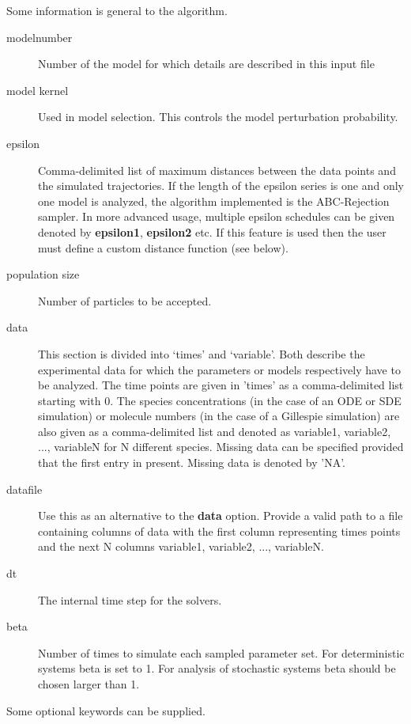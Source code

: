 \documentclass[a4paper]{report}
\begin{document}
Some information is general to the algorithm.
\begin{description}
\item[modelnumber] Number of the model for which details are described in this input file
\item[model kernel] Used in model selection. This controls the model perturbation probability.
\item[epsilon] Comma-delimited list of maximum distances between the data points and the simulated trajectories. If the length of the epsilon series is one and only one model is analyzed, the algorithm implemented is the ABC-Rejection sampler. In more advanced usage, multiple epsilon schedules can be given denoted by {\bf epsilon1}, {\bf epsilon2} etc. If this feature is used then the user must define a custom distance function (see below).
\item[population size] Number of particles to be accepted.
\item[data] This section is divided into `times' and `variable'. Both describe the experimental data for which the parameters or models respectively have to be analyzed. The time points are given in 'times' as a comma-delimited list starting with 0. The species concentrations (in the case of an ODE or SDE simulation) or molecule numbers (in the case of a Gillespie simulation) are also given as a comma-delimited list and denoted as variable1, variable2, ..., variableN for N different species. Missing data can be specified provided that the first entry in present. Missing data is denoted by 'NA'.
\item[datafile] Use this as an alternative to the {\bf data} option. Provide a valid path to a file containing columns of data with the first column representing times points and the next N columns variable1, variable2, ..., variableN.
\item[dt] The internal time step for the solvers.
\item[beta] Number of times to simulate each sampled parameter set. For deterministic systems beta is set to 1. For analysis of stochastic systems beta should be chosen larger than 1.
\end{description}
Some optional keywords can be supplied.
\end{document}
